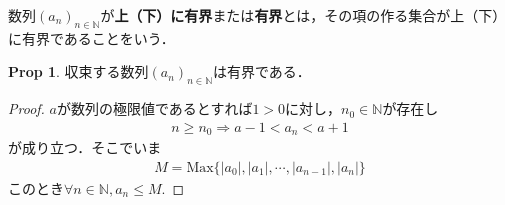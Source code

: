\documentclass{ltjsarticle}
\theoremstyle{definition}
\newtheorem{prop}[thm]{Prop}
\theoremstyle{propcorollarystyle}
\theoremstyle{thmcorollarystyle}
\begin{document}
数列$(a_n)_{n \in \mathbb{N}}$が\textbf{上（下）に有界}または\textbf{有界}とは，その項の作る集合が上（下）に有界であることをいう．

\begin{prop}
  収束する数列$(a_n)_{n \in \mathbb{N}}$は有界である．
\end{prop}
\begin{proof}
  $a$が数列の極限値であるとすれば$1>0$に対し，$n_0 \in \mathbb{N}$が存在し
  \begin{align*}
    n \ge n_0 \Rightarrow a-1<a_n<a+1
  \end{align*}
  が成り立つ．そこでいま
  \begin{align*}
    M=\text{Max}\{|a_0|,|a_1|,\cdots,|a_{n-1}|,|a_n|\}
  \end{align*}
  このとき$\forall n \in \mathbb{N},a_n \le M.$
\end{proof}
\end{document}
